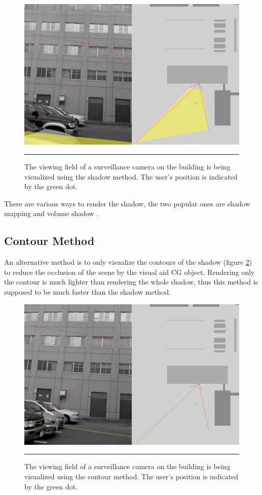 \begin{figure}[htbp]
	\centering
	\includegraphics[width=14cm]{./Primitives/theory_shadow.png}
	\rule{35em}{0.5pt}
	\caption[Shadow method]{The viewing field of a surveillance camera on the building is being visualized using the shadow method. The user's position is indicated by the green dot.}
	\label{fig:ShadowMethod}
\end{figure}

There are various ways to render the shadow, the two popular ones are shadow mapping \cite{Reference7} \cite{Reference8} and volume shadow \cite{Reference9}.

\subsection{Contour Method}

An alternative method is to only visualize the contours of the shadow (figure \ref{fig:ContourMethod}) to reduce the occlusion of the scene by the visual aid CG object. Rendering only the contour is much lighter than rendering the whole shadow, thus this method is supposed to be much faster than the shadow method.

\begin{figure}[htbp]
	\centering
	\includegraphics[width=14cm]{./Primitives/theory_contour.png}
	\rule{35em}{0.5pt}
	\caption[Contour method]{The viewing field of a surveillance camera on the building is being visualized using the contour method. The user's position is indicated by the green dot.}
	\label{fig:ContourMethod}
\end{figure}


